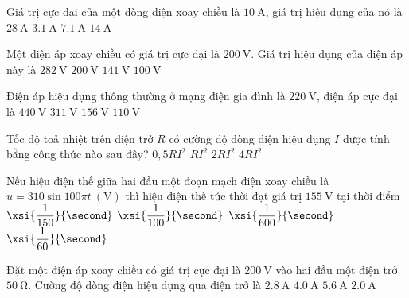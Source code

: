 \begin{ex}
	Giá trị cực đại của một dòng điện xoay chiều là $\SI{10}{\ampere}$, giá trị hiệu dụng của nó là
	\choice
	{$\SI{28}{\ampere}$}
	{$\SI{3.1}{\ampere}$}
	{\True $\SI{7.1}{\ampere}$}
	{$\SI{14}{\ampere}$}
\end{ex}
\begin{ex}
	Một điện áp xoay chiều có giá trị cực đại là $\SI{200}{\volt}$. Giá trị hiệu dụng của điện áp này là
	\choice
	{$\SI{282}{\volt}$}
	{$\SI{200}{\volt}$}
	{\True $\SI{141}{\volt}$}
	{$\SI{100}{\volt}$}
\end{ex}
\begin{ex}
	Điện áp hiệu dụng thông thường ở mạng điện gia đình là $\SI{220}{\volt}$, điện áp cực đại là
	\choice
	{$\SI{440}{\volt}$}
	{\True $\SI{311}{\volt}$}
	{$\SI{156}{\volt}$}
	{$\SI{110}{\volt}$}
\end{ex}

\begin{ex}
	Tốc độ toả nhiệt trên điện trở $R$ có cường độ dòng điện hiệu dụng $I$ được tính bằng công thức nào sau đây?
	\choice
	{$0,5RI^2$}
	{\True $RI^2$}
	{$2RI^2$}
	{$4RI^2$}
	\loigiai{}
\end{ex}
\begin{ex}
	Nếu hiệu điện thế giữa hai đầu một đoạn mạch điện xoay chiều là $u=310 \sin 100 \pi t\ \left(\si{\volt}\right)$ thì hiệu điện thế tức thời đạt giá trị $\SI{155}{\volt}$ tại thời điểm
	\choice
	{$\xsi{\dfrac{1}{150}}{\second}$}
	{$\xsi{\dfrac{1}{100}}{\second}$}
	{\True $\xsi{\dfrac{1}{600}}{\second}$}
	{$\xsi{\dfrac{1}{60}}{\second}$}
	\loigiai{}
\end{ex}
\begin{ex}
	Đặt một điện áp xoay chiều có giá trị cực đại là $\SI{200}{\volt}$ vào hai đầu một điện trở $\SI{50}{\ohm}$. Cường độ dòng điện hiệu dụng qua điện trở là
	\choice
	{\True $\SI{2.8}{\ampere}$}
	{$\SI{4.0}{\ampere}$}
	{$\SI{5.6}{\ampere}$}
	{$\SI{2.0}{\ampere}$}
\end{ex}

